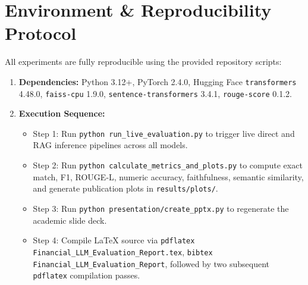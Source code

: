 \documentclass[11pt]{article}
\begin{document}
\section{Environment \& Reproducibility Protocol}
\label{sec:app_reproducibility}

All experiments are fully reproducible using the provided repository scripts:
\begin{enumerate}
    \item \textbf{Dependencies:} Python 3.12+, PyTorch 2.4.0, Hugging Face \texttt{transformers} 4.48.0, \texttt{faiss-cpu} 1.9.0, \texttt{sentence-transformers} 3.4.1, \texttt{rouge-score} 0.1.2.
    \item \textbf{Execution Sequence:}
    \begin{itemize}
        \item Step 1: Run \texttt{python run\_live\_evaluation.py} to trigger live direct and RAG inference pipelines across all models.
        \item Step 2: Run \texttt{python calculate\_metrics\_and\_plots.py} to compute exact match, F1, ROUGE-L, numeric accuracy, faithfulness, semantic similarity, and generate publication plots in \texttt{results/plots/}.
        \item Step 3: Run \texttt{python presentation/create\_pptx.py} to regenerate the academic slide deck.
        \item Step 4: Compile LaTeX source via \texttt{pdflatex Financial\_LLM\_Evaluation\_Report.tex}, \texttt{bibtex Financial\_LLM\_Evaluation\_Report}, followed by two subsequent \texttt{pdflatex} compilation passes.
    \end{itemize}
\end{enumerate}
\end{document}
